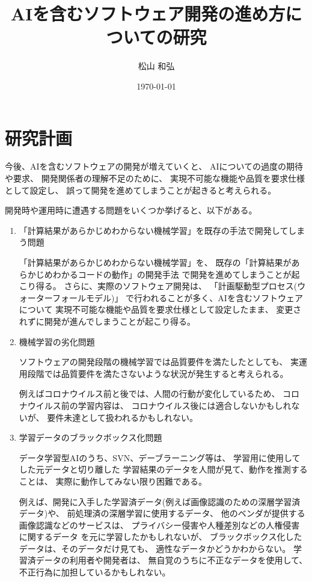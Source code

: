 \documentclass[12pt]{jsarticle}
\title{
AIを含むソフトウェア開発の進め方についての研究
}
\author{松山 和弘}
\date{\today}
\begin{document}
\maketitle
\section{研究計画}

今後、AIを含むソフトウェアの開発が増えていくと、
AIについての過度の期待や要求、
開発関係者の理解不足のために、
実現不可能な機能や品質を要求仕様として設定し、
誤って開発を進めてしまうことが起きると考えられる。

開発時や運用時に遭遇する問題をいくつか挙げると、以下がある。

\begin{enumerate}

\item「計算結果があらかじめわからない機械学習」を既存の手法で開発してしまう問題

「計算結果があらかじめわからない機械学習」を、
既存の「計算結果があらかじめわかるコードの動作」の開発手法
で開発を進めてしまうことが起こり得る。
さらに、実際のソフトウェア開発は、
「計画駆動型プロセス(ウォーターフォールモデル)」
で行われることが多く、AIを含むソフトウェアについて
実現不可能な機能や品質を要求仕様として設定したまま、
変更されずに開発が進んでしまうことが起こり得る。

\item  機械学習の劣化問題

ソフトウェアの開発段階の機械学習では品質要件を満たしたとしても、
実運用段階では品質要件を満たさないような状況が発生すると考えられる。

例えばコロナウイルス前と後では、人間の行動が変化しているため、
コロナウイルス前の学習内容は、
コロナウイルス後には適合しないかもしれないが、
要件未達として扱われるかもしれない。

\item 学習データのブラックボックス化問題

データ学習型AIのうち、SVN、デーブラーニング等は、
学習用に使用してした元データと切り離した
学習結果のデータを人間が見て、動作を推測することは、
実際に動作してみない限り困難である。

例えば、開発に入手した学習済データ(例えば画像認識のための深層学習済データ)や、
前処理済の深層学習に使用するデータ、
他のベンダが提供する画像認識などのサービスは、
プライバシー侵害や人種差別などの人権侵害に関するデータ
を元に学習したかもしれないが、
ブラックボックス化したデータは、そのデータだけ見ても、
適性なデータかどうかわからない。
学習済データの利用者や開発者は、
無自覚のうちに不正なデータを使用して、不正行為に加担しているかもしれない。
\end{enumerate}
\end{document}
